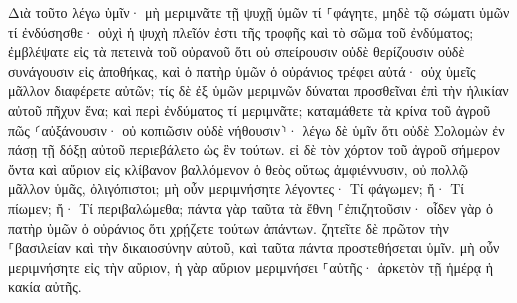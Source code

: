\documentclass[twoside, 9pt]{extreport}
\begin{document}
Διὰ τοῦτο λέγω ὑμῖν· μὴ μεριμνᾶτε τῇ ψυχῇ ὑμῶν τί ⸀φάγητε, μηδὲ τῷ σώματι ὑμῶν τί ἐνδύσησθε· οὐχὶ ἡ ψυχὴ πλεῖόν ἐστι τῆς τροφῆς καὶ τὸ σῶμα τοῦ ἐνδύματος; 
ἐμβλέψατε εἰς τὰ πετεινὰ τοῦ οὐρανοῦ ὅτι οὐ σπείρουσιν οὐδὲ θερίζουσιν οὐδὲ συνάγουσιν εἰς ἀποθήκας, καὶ ὁ πατὴρ ὑμῶν ὁ οὐράνιος τρέφει αὐτά· οὐχ ὑμεῖς μᾶλλον διαφέρετε αὐτῶν; 
τίς δὲ ἐξ ὑμῶν μεριμνῶν δύναται προσθεῖναι ἐπὶ τὴν ἡλικίαν αὐτοῦ πῆχυν ἕνα; 
καὶ περὶ ἐνδύματος τί μεριμνᾶτε; καταμάθετε τὰ κρίνα τοῦ ἀγροῦ πῶς ⸂αὐξάνουσιν· οὐ κοπιῶσιν οὐδὲ νήθουσιν⸃· 
λέγω δὲ ὑμῖν ὅτι οὐδὲ Σολομὼν ἐν πάσῃ τῇ δόξῃ αὐτοῦ περιεβάλετο ὡς ἓν τούτων. 
εἰ δὲ τὸν χόρτον τοῦ ἀγροῦ σήμερον ὄντα καὶ αὔριον εἰς κλίβανον βαλλόμενον ὁ θεὸς οὕτως ἀμφιέννυσιν, οὐ πολλῷ μᾶλλον ὑμᾶς, ὀλιγόπιστοι; 
μὴ οὖν μεριμνήσητε λέγοντες· Τί φάγωμεν; ἤ· Τί πίωμεν; ἤ· Τί περιβαλώμεθα; 
πάντα γὰρ ταῦτα τὰ ἔθνη ⸀ἐπιζητοῦσιν· οἶδεν γὰρ ὁ πατὴρ ὑμῶν ὁ οὐράνιος ὅτι χρῄζετε τούτων ἁπάντων. 
ζητεῖτε δὲ πρῶτον τὴν ⸀βασιλείαν καὶ τὴν δικαιοσύνην αὐτοῦ, καὶ ταῦτα πάντα προστεθήσεται ὑμῖν. 
μὴ οὖν μεριμνήσητε εἰς τὴν αὔριον, ἡ γὰρ αὔριον μεριμνήσει ⸀αὑτῆς· ἀρκετὸν τῇ ἡμέρᾳ ἡ κακία αὐτῆς. 
\end{document}
